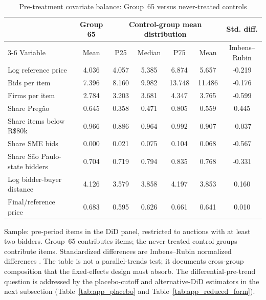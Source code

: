 \documentclass[12pt]{article}
\begin{document}
\begin{table}[!htbp]
\centering
\begin{threeparttable}
\caption{Pre-treatment covariate balance: Group~65 versus never-treated controls}
\label{tab:app_balance}
\scriptsize
\setlength{\tabcolsep}{3pt}
\begin{tabular}{lcccccc}
\toprule
 & \textbf{Group 65} & \multicolumn{4}{c}{\textbf{Control-group mean distribution}} & \textbf{Std. diff.} \\
\cmidrule(lr){3-6}
Variable & Mean & P25 & Median & P75 & Mean & Imbens--Rubin \\
\midrule
Log reference price & 4.036 & 4.057 & 5.385 & 6.874 & 5.657 & -0.219 \\
Bids per item & 7.396 & 8.160 & 9.982 & 13.748 & 11.486 & -0.176 \\
Firms per item & 2.784 & 3.203 & 3.681 & 4.347 & 3.765 & -0.599 \\
Share Preg\~ao & 0.645 & 0.358 & 0.471 & 0.805 & 0.559 & 0.445 \\
Share items below R\$80k & 0.966 & 0.886 & 0.964 & 0.992 & 0.907 & -0.037 \\
Share SME bids & 0.000 & 0.021 & 0.075 & 0.104 & 0.068 & -0.567 \\
Share S\~ao Paulo-state bidders & 0.704 & 0.719 & 0.794 & 0.835 & 0.768 & -0.331 \\
Log bidder-buyer distance & 4.126 & 3.579 & 3.858 & 4.197 & 3.853 & 0.160 \\
Final/reference price & 0.683 & 0.595 & 0.626 & 0.661 & 0.641 & 0.010 \\
\bottomrule
\end{tabular}
\begin{tablenotes}\footnotesize
\item Sample: pre-period items in the DiD panel, restricted to auctions with at
least two bidders. Group~65 contributes \balanceNGsixfiveItems{} items; the
\balanceNCtrlGroups{} never-treated control groups contribute
\balanceNCtrlItems{} items. Standardized differences are Imbens--Rubin
normalized differences \citep{imbens2015}. The table is not a
parallel-trends test; it documents cross-group composition that the
fixed-effects design must absorb. The differential-pre-trend question is
addressed by the placebo-cutoff and alternative-DiD estimators in the
next subsection (Table~\ref{tab:app_placebo} and
Table~\ref{tab:app_reduced_form}).
\end{tablenotes}
\end{threeparttable}
\end{table}
\end{document}
